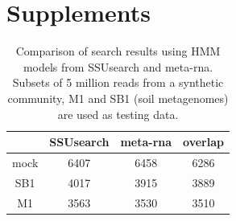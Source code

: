 \documentclass[12pt]{article}
\begin{document}



\section{Supplements}


\begin{table}[tbph!]
\caption{Comparison of search results using HMM models from SSUsearch and meta-rna. Subsets of 5 million reads from a synthetic community, M1 and SB1 (soil metagenomes) are used as testing data.}
\label{tab:hmm_comparison}
\begin{tabular}{cccc}
\toprule
     & SSUsearch & meta-rna & overlap \\
\midrule
mock & 6407      & 6458     & 6286 \\
SB1  & 4017      & 3915     & 3889 \\
M1   & 3563      & 3530     & 3510 \\
\bottomrule
\end{tabular}
\end{table}
\end{document}

